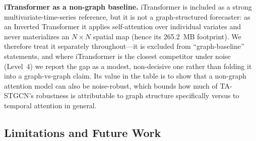\documentclass[a4paper,fleqn]{cas-sc}
\begin{document}
\textbf{iTransformer as a non-graph baseline.} iTransformer is included as a strong multivariate-time-series reference, but it is not a graph-structured forecaster: as an Inverted Transformer it applies self-attention over individual variates and never materializes an $N\times N$ spatial map (hence its 265.2~MB footprint). We therefore treat it separately throughout---it is excluded from ``graph-baseline'' statements, and where iTransformer is the closest competitor under noise (Level~4) we report the gap as a modest, non-decisive one rather than folding it into a graph-vs-graph claim. Its value in the table is to show that a non-graph attention model can also be noise-robust, which bounds how much of TA-STGCN's robustness is attributable to graph structure specifically versus to temporal attention in general.

\subsection{Limitations and Future Work}
\end{document}
